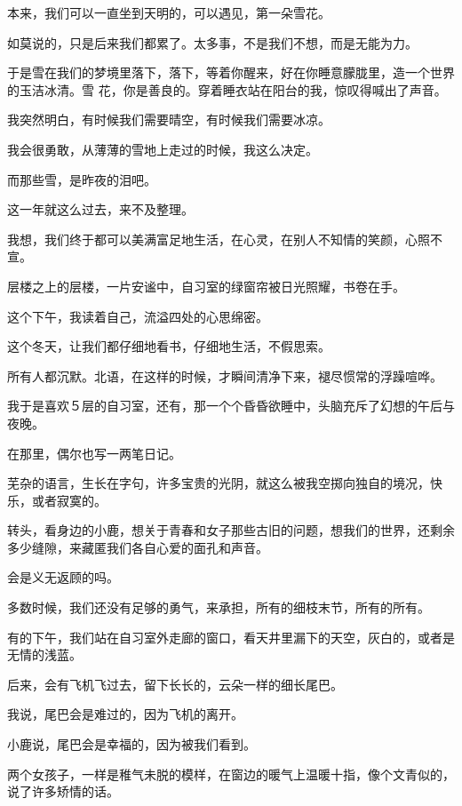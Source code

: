 \documentclass[12pt,a4paper]{article}
\begin{document}
		本来，我们可以一直坐到天明的，可以遇见，第一朵雪花。

		如莫说的，只是后来我们都累了。太多事，不是我们不想，而是无能为力。

		于是雪在我们的梦境里落下，落下，等着你醒来，好在你睡意朦胧里，造一个世界的玉洁冰清。雪
	花，你是善良的。穿着睡衣站在阳台的我，惊叹得喊出了声音。


		我突然明白，有时候我们需要晴空，有时候我们需要冰凉。

		我会很勇敢，从薄薄的雪地上走过的时候，我这么决定。

		而那些雪，是昨夜的泪吧。

		这一年就这么过去，来不及整理。

	\endwriting



		我想，我们终于都可以美满富足地生活，在心灵，在别人不知情的笑颜，心照不宣。

		层楼之上的层楼，一片安谧中，自习室的绿窗帘被日光照耀，书卷在手。\par
		这个下午，我读着自己，流溢四处的心思绵密。\par
		这个冬天，让我们都仔细地看书，仔细地生活，不假思索。\par
		所有人都沉默。北语，在这样的时候，才瞬间清净下来，褪尽惯常的浮躁喧哗。\par
		我于是喜欢５层的自习室，还有，那一个个昏昏欲睡中，头脑充斥了幻想的午后与夜晚。

		在那里，偶尔也写一两笔日记。\par
		芜杂的语言，生长在字句，许多宝贵的光阴，就这么被我空掷向独自的境况，快乐，或者寂寞的。\par
		转头，看身边的小鹿，想关于青春和女子那些古旧的问题，想我们的世界，还剩余多少缝隙，来藏匿我们各自心爱的面孔和声音。\par
		会是义无返顾的吗。\par
		多数时候，我们还没有足够的勇气，来承担，所有的细枝末节，所有的所有。

		有的下午，我们站在自习室外走廊的窗口，看天井里漏下的天空，灰白的，或者是无情的浅蓝。\par
		后来，会有飞机飞过去，留下长长的，云朵一样的细长尾巴。\par
		我说，尾巴会是难过的，因为飞机的离开。\par
		小鹿说，尾巴会是幸福的，因为被我们看到。\par
		两个女孩子，一样是稚气未脱的模样，在窗边的暖气上温暖十指，像个文青似的，说了许多矫情的话。
\end{document}

